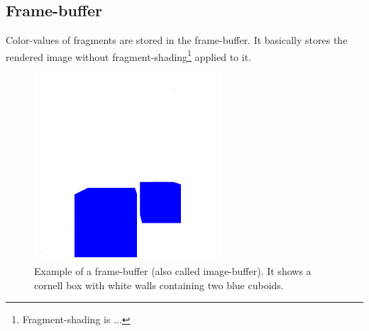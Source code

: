 \documentclass{ACGSeminar}
\begin{document}
	\subsection{Frame-buffer}%
		Color-values of fragments are stored in the frame-buffer. It basically stores the rendered image without fragment-shading\footnote{Fragment-shading is ...} applied to it.%
		\begin{figure}[htb!]%
			\begin{center}%
				\includegraphics[width=7cm]{img/frame_buffer.png}
			\end{center}%
			\caption{Example of a frame-buffer (also called image-buffer). It shows a cornell box with white walls containing two blue cuboids.}%
			\label{fig:frame_buffer}%
		\end{figure}%
\end{document}
